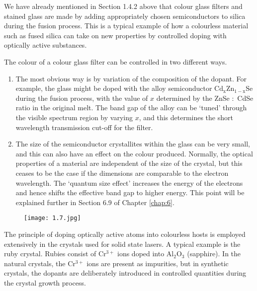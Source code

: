 \documentclass[12pt]{book}
\begin{document}
We have already mentioned in Section 1.4.2 above that colour glass filters and stained glass are made by adding appropriately chosen semiconductors to silica during the fusion process. This is a typical example of how a colourless material such as fused silica can take on new properties by controlled doping with optically active substances.

The colour of a colour glass filter can be controlled in two different ways.
\begin{enumerate}
  \item The most obvious way is by variation of the composition of the dopant. For example, the glass might be doped with the alloy semiconductor $\mathrm{Cd_xZn_{1-x}Se}$ during the fusion process, with the value of $x$ determined by the ZnSe $:$ CdSe ratio in the original melt. The band gap of the alloy can be `tuned' through the visible spectrum region by varying $x$, and this determines the short wavelength transmission cut-off for the filter.
  \item The size of the semiconductor crystallites within the glass can be very small, and this can also have an effect on the colour produced. Normally, the optical properties of a material are independent of the size of the crystal, but this ceases to be the case if the dimensions are comparable to the electron wavelength. The `quantum size effect' increases the energy of the electrons and hence shifts the effective band gap to higher energy. This point will be explained further in Section 6.9 of Chapter \ref{chap:6}.
\end{enumerate}

\begin{figure}
  \centering
  \texttt{[image: 1.7.jpg]}\\
  \label{fig:1.7}
\end{figure}


The principle of doping optically active atoms into colourless hosts is employed extensively in the crystals used for solid state lasers. A typical example is the ruby crystal. Rubies consist of $\mathrm{Cr^{3+}}$ ions doped into $\mathrm{Al_2O_3}$ (sapphire). In the natural crystals, the $\mathrm{Cr^{3+}}$ ions are present as impurities, but in synthetic crystals, the dopants are deliberately introduced in controlled quantities during the crystal growth process.
\end{document}
